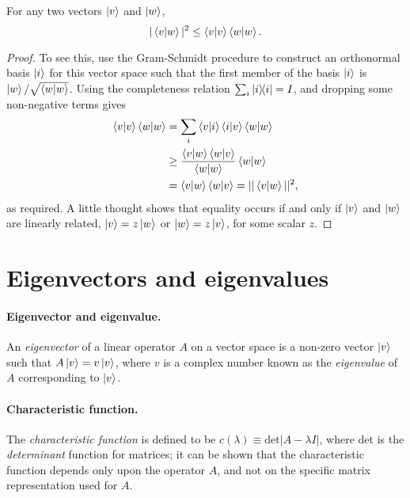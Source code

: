 \begin{theorem}
  For any two vectors $\ket{v}$ and $\ket{w}$, \begin{equation}
    |\braket{v}{w}|^2 \leq \braket{v}{v}\braket{w}{w}. \label{eq:cau-sch-ine}
  \end{equation}
\end{theorem}
\begin{proof}
  To see this, use the Gram-Schmidt procedure to construct an orthonormal basis
  $\ket{i}$ for this vector space such that the first member of the basis
  $\ket{i}$ is $\ket{w}/\sqrt{\braket{w}{w}}$. Using the completeness relation
  $\sum_i \ketbra{i}{i} = I$, and dropping some non-negative terms gives
  \begin{align*}
    \braket{v}{v}\braket{w}{w}
      &= \sum_i \braket{v}{i}\braket{i}{v} \braket{w}{w} \\
      &\geq \frac{\braket{v}{w}\braket{w}{v}}{\braket{w}{w}} \braket{w}{w} \\
      &= \braket{v}{w}\braket{w}{v} = ||\braket{v}{w}||^2,
  \end{align*} as required. A little thought shows that equality occurs if and
  only if $\ket{v}$ and $\ket{w}$ are linearly related, $\ket{v} = z\ket{w}$ or
  $\ket{w} = z\ket{v}$, for some scalar $z$.
\end{proof}

\section{Eigenvectors and eigenvalues}

\paragraph{Eigenvector and eigenvalue.} An \emph{eigenvector} of a linear
operator $A$ on a vector space is a non-zero vector $\ket{v}$ such that
$A\ket{v} = v\ket{v}$, where $v$ is a complex number known as the
\emph{eigenvalue} of $A$ corresponding to $\ket{v}$.

\paragraph{Characteristic function.} The \emph{characteristic function} is
defined to be $c(\lambda) \equiv \text{det} |A - \lambda I|$, where
$\text{det}$ is the \emph{determinant} function for matrices; it can be shown
that the characteristic function depends only upon the operator $A$, and not on
the specific matrix representation used for $A$.

